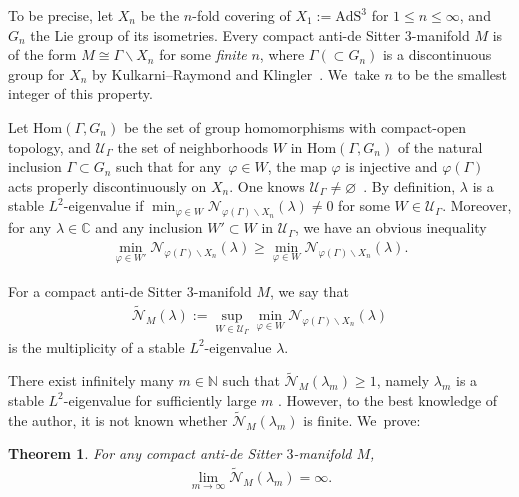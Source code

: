\documentclass[pdftex]{sigma}
\numberwithin{equation}{section}
\newtheorem{Theorem}{Theorem}[section]
\begin{document}
To be precise, let $X_{n}$ be the $n$-fold covering of $X_{1}:=\mathrm{AdS}^{3}$
for $1\leq n \leq \infty$,
and $G_{n}$ the Lie group of its isometries.
Every compact anti-de Sitter $3$-manifold $M$ is of the form
$M\cong\Gamma\backslash X_{n}$ for some \textit{finite} $n$,
where $\Gamma (\subset G_{n})$ is a discontinuous group for $X_{n}$
by Kulkarni--Raymond \cite[Theorem~7.2]{KuRa85} and Klingler~\cite{Kl96}. We~take $n$ to be the smallest integer of this property.

Let $\mathrm{Hom}(\Gamma,G_{n})$ be the set of
group homomorphisms with compact-open topology,
and $\mathcal{U}_{\Gamma}$ the set of neighborhoods $W$ in
$\mathrm{Hom}(\Gamma,G_{n})$
of the natural inclusion $\Gamma \subset G_{n}$
such that for any~$\varphi \in W$, the map $\varphi$ is injective and
$\varphi(\Gamma)$ acts properly discontinuously on $X_{n}$.
One knows $\mathcal{U}_{\Gamma}\neq\varnothing$~\cite{Kl96,Kob98}.
By definition, $\lambda$ is a stable $L^2$-eigenvalue if
$\min_{\varphi \in W} \mathcal{N}_{\varphi(\Gamma)\backslash X_{n}}(\lambda)\neq0$
for some $W \in \mathcal{U}_{\Gamma}$.
Moreover, for any $\lambda \in \mathbb{C}$ and
any inclusion $W'\subset W$ in $\mathcal{U}_{\Gamma}$,
we have an obvious inequality
\begin{gather*}
\min_{\varphi \in W'}
\mathcal{N}_{\varphi(\Gamma)\backslash X_{n}}(\lambda)
\geq
\min_{\varphi \in W}
\mathcal{N}_{\varphi(\Gamma)\backslash X_{n}}(\lambda).
\end{gather*}

\begin{Definition}
\label{stab-mult}
For a compact anti-de Sitter $3$-manifold $M$, we say that
\begin{gather*}
\widetilde{\mathcal{N}}_{M}(\lambda):=
\sup_{W\in\mathcal{U}_{\Gamma}}\min_{\varphi \in W}
\mathcal{N}_{\varphi(\Gamma)\backslash X_{n}}(\lambda)
\end{gather*}
is the multiplicity of a stable $L^2$-eigenvalue $\lambda$.
\end{Definition}

There exist infinitely many $m\in \mathbb{N}$
such that $\widetilde{\mathcal{N}}_{M}(\lambda_{m})\geq1$,
namely $\lambda_{m}$ is a stable $L^2$-eigen\-value
for sufficiently large $m$ \cite[Corollary~9.10]{KaKob16}.
However, to the best knowledge of the author,
it is not known whether
$\widetilde{\mathcal{N}}_{M}(\lambda_{m})$
is finite. We~prove:
\begin{Theorem}\label{mthm2}
For any compact anti-de Sitter $3$-manifold $M$,
\begin{gather*}
\lim_{m \to \infty}
\widetilde{\mathcal{N}}_{M}(\lambda_{m})=\infty.
\end{gather*}
\end{Theorem}
\end{document}
